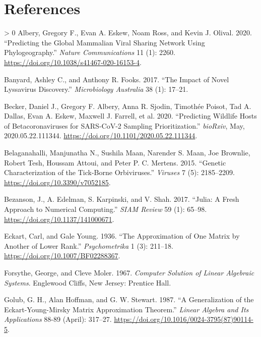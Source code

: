 \documentclass[11pt]{article}
\newlength{\cslhangindent}
\newenvironment{CSLReferences}[3] %
 {%
  \setlength{\parindent}{0pt}
  \ifodd #1 \everypar{\setlength{\hangindent}{\cslhangindent}}\ignorespaces\fi
  \ifnum #2 > 0
  \setlength{\parskip}{#2\baselineskip}
  \fi
 }%
 {}
\begin{document}
\hypertarget{references}{%
\section*{References}\label{references}}

\hypertarget{refs}{}
\begin{CSLReferences}{1}{0}
\leavevmode\hypertarget{ref-Albery2020PreGlo}{}%
Albery, Gregory F., Evan A. Eskew, Noam Ross, and Kevin J. Olival. 2020.
{``Predicting the Global Mammalian Viral Sharing Network Using
Phylogeography.''} \emph{Nature Communications} 11 (1): 2260.
\url{https://doi.org/10.1038/s41467-020-16153-4}.

\leavevmode\hypertarget{ref-Banyard2017ImpNov}{}%
Banyard, Ashley C., and Anthony R. Fooks. 2017. {``The Impact of Novel
Lyssavirus Discovery.''} \emph{Microbiology Australia} 38 (1): 17--21.

\leavevmode\hypertarget{ref-Becker2020PreWil}{}%
Becker, Daniel J., Gregory F. Albery, Anna R. Sjodin, Timothée Poisot,
Tad A. Dallas, Evan A. Eskew, Maxwell J. Farrell, et al. 2020.
{``Predicting Wildlife Hosts of Betacoronaviruses for SARS-CoV-2
Sampling Prioritization.''} \emph{bioRxiv}, May, 2020.05.22.111344.
\url{https://doi.org/10.1101/2020.05.22.111344}.

\leavevmode\hypertarget{ref-Belaganahalli2015GenCha}{}%
Belaganahalli, Manjunatha N., Sushila Maan, Narender S. Maan, Joe
Brownlie, Robert Tesh, Houssam Attoui, and Peter P. C. Mertens. 2015.
{``Genetic Characterization of the Tick-Borne Orbiviruses.''}
\emph{Viruses} 7 (5): 2185--2209.
\url{https://doi.org/10.3390/v7052185}.

\leavevmode\hypertarget{ref-Bezanson2017JulFre}{}%
Bezanson, J., A. Edelman, S. Karpinski, and V. Shah. 2017. {``Julia: A
Fresh Approach to Numerical Computing.''} \emph{SIAM Review} 59 (1):
65--98. \url{https://doi.org/10.1137/141000671}.

\leavevmode\hypertarget{ref-Eckart1936AppOne}{}%
Eckart, Carl, and Gale Young. 1936. {``The Approximation of One Matrix
by Another of Lower Rank.''} \emph{Psychometrika} 1 (3): 211--18.
\url{https://doi.org/10.1007/BF02288367}.

\leavevmode\hypertarget{ref-Forsythe1967ComSol}{}%
Forsythe, George, and Cleve Moler. 1967. \emph{Computer Solution of
Linear Algebraic Systems}. Englewood Cliffs, New Jersey: Prentice Hall.

\leavevmode\hypertarget{ref-Golub1987GenEck}{}%
Golub, G. H., Alan Hoffman, and G. W. Stewart. 1987. {``A Generalization
of the Eckart-Young-Mirsky Matrix Approximation Theorem.''} \emph{Linear
Algebra and Its Applications} 88-89 (April): 317--27.
\url{https://doi.org/10.1016/0024-3795(87)90114-5}.


\end{CSLReferences}
\end{document}
